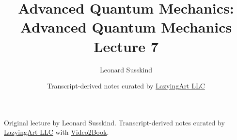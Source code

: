 \documentclass[11pt,oneside]{book}
\begin{document}
\frontmatter
\title{Advanced Quantum Mechanics: Advanced Quantum Mechanics Lecture 7}
\author{Leonard Susskind}
\date{Transcript-derived notes curated by \href{https://lazying.art}{LazyingArt LLC}}
\maketitle
\begin{center}
\small Original lecture by Leonard Susskind. Transcript-derived notes curated by \href{https://lazying.art}{LazyingArt LLC} with \href{https://github.com/lachlanchen/Video2Book}{Video2Book}.
\end{center}
\clearpage
\mainmatter

\end{document}
